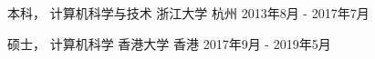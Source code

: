 

\begin{cventries}


\cventry
{本科， 计算机科学与技术} %
{浙江大学} %
{杭州} %
{2013年8月 - 2017年7月} %
{ %
}


\cventry
{硕士， 计算机科学} %
{香港大学} %
{香港} %
{2017年9月 - 2019年5月} %
{ %
}
\end{cventries}